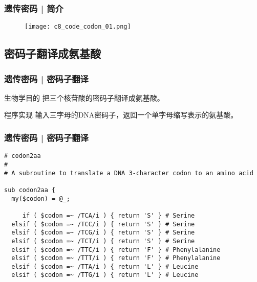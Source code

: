 \begin{frame}
  \frametitle{遗传密码 | 简介}
  \begin{figure}
    \centering
    \texttt{[image: c8\_code\_codon\_01.png]}
  \end{figure}
\end{frame}

\subsection{密码子翻译成氨基酸}
\begin{frame}
  \frametitle{遗传密码 | 密码子翻译}
  \begin{block}{生物学目的}
 把三个核苷酸的密码子翻译成氨基酸。 
  \end{block}
  \pause
  \begin{block}{程序实现}
    输入三字母的DNA密码子，返回一个单字母缩写表示的氨基酸。
  \end{block}
\end{frame}

\begin{frame}[fragile]
  \frametitle{遗传密码 | 密码子翻译}
\begin{lstlisting}[firstnumber=1,basicstyle=\footnotesize\tt,numberstyle=\scriptsize]
# codon2aa
#
# A subroutine to translate a DNA 3-character codon to an amino acid

sub codon2aa {
  my($codon) = @_;
          
     if ( $codon =~ /TCA/i ) { return 'S' } # Serine
  elsif ( $codon =~ /TCC/i ) { return 'S' } # Serine
  elsif ( $codon =~ /TCG/i ) { return 'S' } # Serine
  elsif ( $codon =~ /TCT/i ) { return 'S' } # Serine
  elsif ( $codon =~ /TTC/i ) { return 'F' } # Phenylalanine
  elsif ( $codon =~ /TTT/i ) { return 'F' } # Phenylalanine
  elsif ( $codon =~ /TTA/i ) { return 'L' } # Leucine
  elsif ( $codon =~ /TTG/i ) { return 'L' } # Leucine
\end{lstlisting}
\end{frame}

